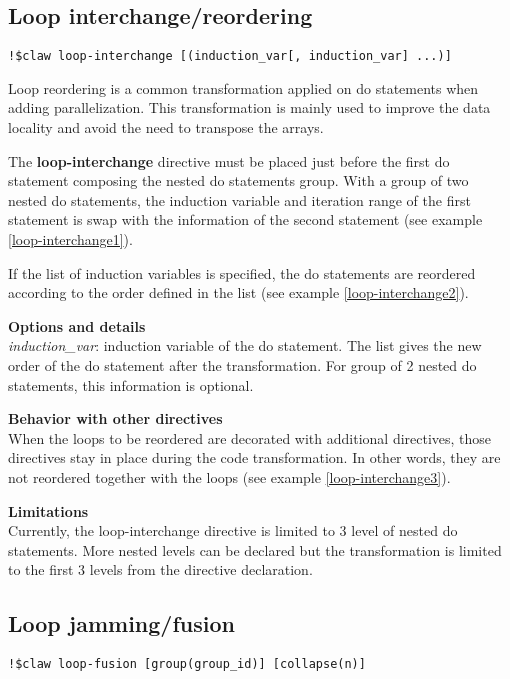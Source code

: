 \documentclass{article}
\begin{document}
\subsection{Loop interchange/reordering}
\begin{lstlisting}
!$claw loop-interchange [(induction_var[, induction_var] ...)]
\end{lstlisting}

Loop reordering is a common transformation applied on do statements when adding parallelization. This transformation is mainly used to improve the data locality and avoid the need to transpose the arrays.

The \textbf{loop-interchange} directive must be placed just before the first do statement composing the nested do statements group. With a group of two nested do statements, the induction variable and iteration range of the first statement is swap with the information of the second statement (see example \ref{loop-interchange1}). 

If the list of induction variables is specified, the do statements are reordered according to the order defined in the list (see example \ref{loop-interchange2}).

\textbf{Options and details}\\
\textit{induction\_var}: induction variable of the do statement. The list gives the new order of the do statement after the transformation. For group of 2 nested do statements, this information is optional. 

\textbf{Behavior with other directives}\\
When the loops to be reordered are decorated with additional directives, those directives stay in place during the code transformation. In other words, they are not reordered together with the loops (see example \ref{loop-interchange3}).

\textbf{Limitations}\\
Currently, the loop-interchange directive is limited to 3 level of nested do statements. More nested levels can be declared but the transformation is limited to the first 3 levels from the directive declaration.

\subsection{Loop jamming/fusion}
\begin{lstlisting}
!$claw loop-fusion [group(group_id)] [collapse(n)]
\end{lstlisting}
\end{document}
